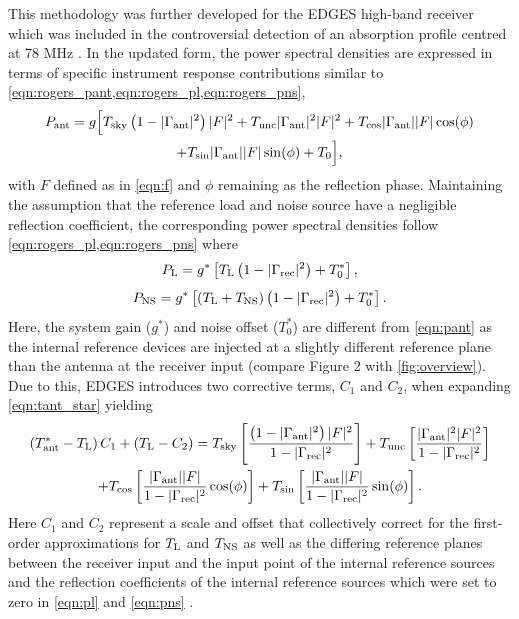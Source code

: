 This methodology was further developed for the EDGES high-band receiver which was included in the controversial detection of an absorption profile centred at 78 MHz \citep{edgesNature}. In the updated form, the power spectral densities are expressed in terms of specific instrument response contributions similar to \cref{eqn:rogers_pant,eqn:rogers_pl,eqn:rogers_pns},
\begin{multline}
    P_{\mathrm{ant}} = g \Big[ T_{\mathrm{sky}} \left( 1 - |\Gamma_{\mathrm{ant}}|^2 \right) |F|^2 + T_{\mathrm{unc}}|\Gamma_{\mathrm{ant}}|^2|F|^2 + T_{\mathrm{cos}}|\Gamma_{\mathrm{ant}}||F|\cos(\phi) \\
    + T_{\mathrm{sin}}|\Gamma_{\mathrm{ant}}||F|\sin(\phi) + T_0 \Big],
    \label{eqn:pant}
\end{multline}
with $F$ defined as in \cref{eqn:f} and $\phi$ remaining as the reflection phase. Maintaining the assumption that the reference load and noise source have a negligible reflection coefficient, the corresponding power spectral densities follow \cref{eqn:rogers_pl,eqn:rogers_pns} where
\begin{equation}
    P_{\mathrm{L}} = g^* \left[ T_{\mathrm{L}} \left( 1 - |\Gamma_{\mathrm{rec}}|^2 \right) + T_0^* \right],
    \label{eqn:pl}
\end{equation}
\begin{equation}
    P_{\mathrm{NS}} = g^* \left[ \left( T_{\mathrm{L}} + T_{\mathrm{NS}} \right) \left( 1 - |\Gamma_{\mathrm{rec}}|^2 \right) + T_0^* \right].
    \label{eqn:pns}
\end{equation}
Here, the system gain ($g^*$) and noise offset ($T_0^*$) are different from \cref{eqn:pant} as the internal reference devices are injected at a slightly different reference plane than the antenna at the receiver input (compare \citet{edgesCal} Figure 2 with \cref{fig:overview}). Due to this, EDGES introduces two corrective terms, $C_1$ and $C_2$, when expanding \cref{eqn:tant_star} yielding
\begin{multline}
    \left( T_{\mathrm{ant}}^* - T_{\mathrm{L}} \right)C_1 + \left( T_{\mathrm{L}} - C_2 \right) = T_{\mathrm{sky}}\left[ \frac{\left(1-|\Gamma_{\mathrm{ant}}|^2\right)|F|^2}{1 - |\Gamma_{\mathrm{rec}}|^2} \right] + T_{\mathrm{unc}}\left[\frac{|\Gamma_{\mathrm{ant}}|^2|F|^2}{1 - |\Gamma_{\mathrm{rec}}|^2} \right] \\
    + T_{\mathrm{cos}}\left[ \frac{|\Gamma_{\mathrm{ant}}||F|}{1 - |\Gamma_{\mathrm{rec}}|^2}\cos(\phi) \right] + T_{\mathrm{sin}}\left[ \frac{|\Gamma_{\mathrm{ant}}||F|}{1 - |\Gamma_{\mathrm{rec}}|^2}\sin(\phi)\right].
    \label{eqn:edges_second_calibrated_temperature}
\end{multline}
Here $C_1$ and $C_2$ represent a scale and offset that collectively correct for the first-order approximations for $T_{\mathrm{L}}$ and $T_{\mathrm{NS}}$ as well as the differing reference planes between the receiver input and the input point of the internal reference sources and the reflection coefficients of the internal reference sources which were set to zero in \cref{eqn:pl} and \cref{eqn:pns} \citep{edgesCal}.


